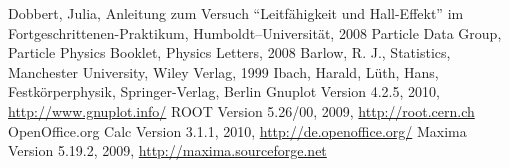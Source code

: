 \renewcommand{\refname}{Literatur und Programme}
\begin{thebibliography}{xxxxxx}
Dobbert, Julia, Anleitung zum Versuch ``Leitfähigkeit und Hall-Effekt'' im Fortgeschrittenen-Praktikum, Humboldt–Universität, 2008
Particle Data Group, Particle Physics Booklet, Physics Letters, 2008
Barlow, R. J., Statistics, Manchester University, Wiley Verlag, 1999
Ibach, Harald, Lüth, Hans, Festkörperphysik, Springer-Verlag, Berlin
Gnuplot Version 4.2.5, 2010, \href{http://www.gnuplot.info/}{http://www.gnuplot.info/}
ROOT Version 5.26/00, 2009, \href{http://root.cern.ch}{http://root.cern.ch}
OpenOffice.org Calc Version 3.1.1, 2010,
\href{http://de.openoffice.org/}{http://de.openoffice.org/}
Maxima Version 5.19.2, 2009, \href{http://maxima.sourceforge.net}{http://maxima.sourceforge.net}
\end{thebibliography}